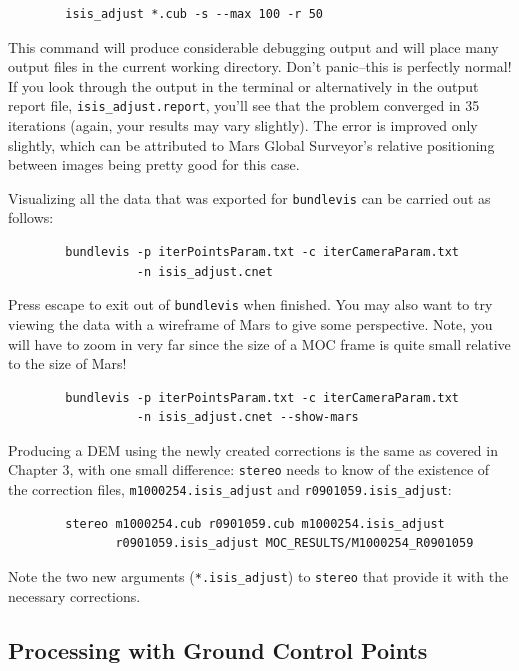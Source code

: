 \begin{verbatim}
        isis_adjust *.cub -s --max 100 -r 50
\end{verbatim}

This command will produce considerable debugging output and will
place many output files in the current working directory. Don't
panic--this is perfectly normal! If you look through the output in
the terminal or alternatively in the output report file,
\texttt{isis\_adjust.report}, you'll see that the problem converged
in 35 iterations (again, your results may vary slightly).  The error
is improved only slightly, which can be attributed to Mars Global
Surveyor's relative positioning between images being pretty good
for this case.

Visualizing all the data that was exported for \texttt{bundlevis} can
be carried out as follows:

\begin{verbatim}
        bundlevis -p iterPointsParam.txt -c iterCameraParam.txt
                  -n isis_adjust.cnet
\end{verbatim}

Press escape to exit out of \texttt{bundlevis} when finished.  You may
also want to try viewing the data with a wireframe of Mars to give
some perspective. Note, you will have to zoom in very far since the
size of a MOC frame is quite small relative to the size of Mars!

\begin{verbatim}
        bundlevis -p iterPointsParam.txt -c iterCameraParam.txt
                  -n isis_adjust.cnet --show-mars
\end{verbatim}

Producing a DEM using the newly created corrections is the same as
covered in Chapter 3, with one small difference: \texttt{stereo} needs
to know of the existence of the correction files,
\texttt{m1000254.isis\_adjust} and \texttt{r0901059.isis\_adjust}:

\begin{verbatim}
        stereo m1000254.cub r0901059.cub m1000254.isis_adjust
               r0901059.isis_adjust MOC_RESULTS/M1000254_R0901059
\end{verbatim}

Note the two new arguments (\texttt{*.isis\_adjust}) to \texttt{stereo}
that provide it with the necessary corrections.

\subsection{Processing with Ground Control Points}

